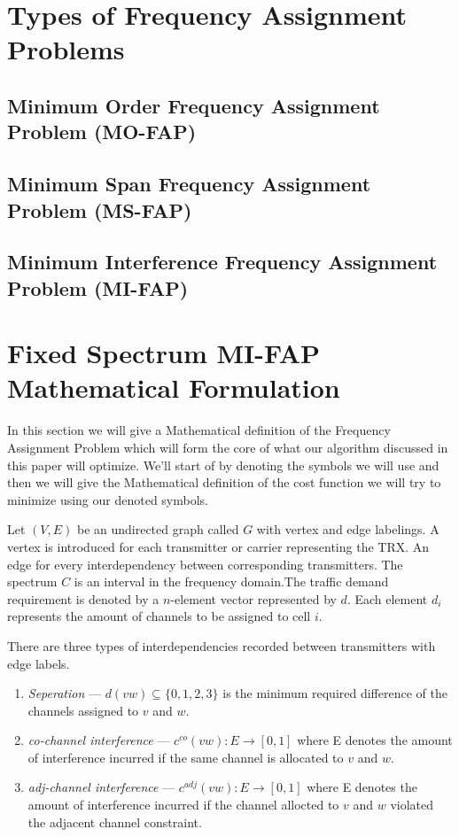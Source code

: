 \section{Types of Frequency Assignment Problems}
\subsection{Minimum Order Frequency Assignment Problem (MO-FAP)}
\subsection{Minimum Span Frequency Assignment Problem (MS-FAP)}
\subsection{Minimum Interference Frequency Assignment Problem (MI-FAP)}
\section{Fixed Spectrum MI-FAP Mathematical Formulation}
In this section we will give a Mathematical definition of the Frequency Assignment Problem which will form the core of what our algorithm discussed in this paper will optimize. We'll start of by denoting the symbols we will use and then we will give the Mathematical definition of the cost function we will try to minimize using our denoted symbols.

Let \((V,E)\) be an undirected graph called \(G\) with vertex and edge labelings. A vertex is introduced for each transmitter or carrier representing the TRX. An edge for every interdependency between corresponding transmitters. The spectrum \(C\) is an interval in the frequency domain.The traffic demand requirement is denoted by a \(n\)-element vector represented by \(d\). Each element \(d_i\) represents the amount of channels to be assigned to cell \(i\).

There are three types of interdependencies recorded between transmitters with edge labels.
\begin{enumerate}
\item \emph{Seperation} --- \(d(vw) \subseteq \{0,1,2,3\}\) is the minimum required difference of the channels assigned to \(v\) and \(w\).
\item \emph{co-channel interference} --- \(c^{co} (vw) : E \rightarrow [0,1]\) where E denotes the amount of interference incurred if the same channel is allocated to \(v\) and \(w\).
\item \emph{adj-channel interference} --- \(c^{adj} (vw) : E \rightarrow [0,1]\) where E denotes the amount of interference incurred if the channel allocted to \(v\) and \(w\) violated the adjacent channel constraint.
\end{enumerate}

